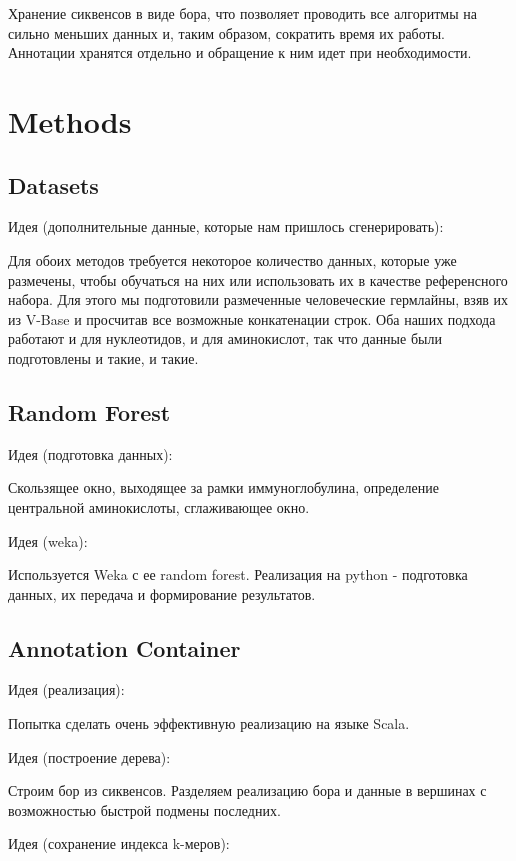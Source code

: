 \documentclass[a4paper,12pt]{article}
\begin{document}
  Хранение сиквенсов в виде бора, что позволяет проводить все
  алгоритмы на сильно меньших данных и, таким образом, сократить время
  их работы. Аннотации хранятся отдельно и обращение к ним идет при
  необходимости.

  \section{Methods}

  \subsection{Datasets}

  Идея (дополнительные данные, которые нам пришлось сгенерировать):

  Для обоих методов требуется некоторое количество данных, которые уже
  размечены, чтобы обучаться на них или использовать их в качестве
  референсного набора. Для этого мы подготовили размеченные
  человеческие гермлайны, взяв их из V-Base и просчитав все возможные
  конкатенации строк. Оба наших подхода работают и для нуклеотидов, и
  для аминокислот, так что данные были подготовлены и такие, и такие.

  \subsection{Random Forest}

  Идея (подготовка данных):

  Скользящее окно, выходящее за рамки иммуноглобулина, определение
  центральной аминокислоты, сглаживающее окно.

  Идея (weka):

  Используется Weka с ее random forest. Реализация на python -
  подготовка данных, их передача и формирование результатов.

  \subsection{Annotation Container}

  Идея (реализация):

  Попытка сделать очень эффективную реализацию на языке Scala.

  Идея (построение дерева):

  Строим бор из сиквенсов. Разделяем реализацию бора и данные в
  вершинах с возможностью быстрой подмены последних.

  Идея (сохранение индекса k-меров):
\end{document}

